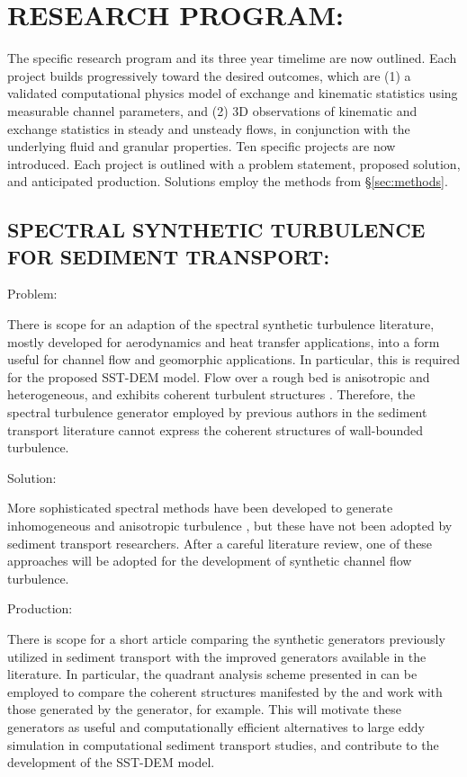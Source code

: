 \section{RESEARCH PROGRAM:} \label{sec:program}

The specific research program and its three year timelime are now outlined. Each project builds progressively toward the desired outcomes, which are (1) a validated computational physics model of exchange and kinematic statistics using measurable channel parameters, and (2) 3D observations of kinematic and exchange statistics in steady and unsteady flows, in conjunction with the underlying fluid and granular properties. Ten specific projects are now introduced. Each project is outlined with a problem statement, proposed solution, and anticipated production. Solutions employ the methods from \S \ref{sec:methods}. 

\subsection{SPECTRAL SYNTHETIC TURBULENCE FOR SEDIMENT TRANSPORT:} 

Problem: 

There is scope for an adaption of the spectral synthetic turbulence literature, mostly developed for aerodynamics and heat transfer applications, into a form useful for channel flow and geomorphic applications. In particular, this is required for the proposed SST-DEM model.  Flow over a rough bed is anisotropic and heterogeneous, and exhibits coherent turbulent structures \citep{Adrian2007}. Therefore, the spectral turbulence generator employed by previous authors in the sediment transport literature \citep{Bialik2012,Nikora2001} cannot express the coherent structures of wall-bounded turbulence. 
\bigskip 

Solution: 

More sophisticated spectral methods have been developed to generate inhomogeneous and anisotropic turbulence \citep{Smirnov2001, Clark2011, Shur2014, Adler2018}, but these have not been adopted by sediment transport researchers. After a careful literature review, one of these approaches will be adopted for the development of synthetic channel flow turbulence. 
\bigskip 

Production:
 
There is scope for a short article comparing the synthetic generators previously utilized in sediment transport with the improved generators available in the literature. In particular, the quadrant analysis scheme presented in \cite{Ferreira2009} can be employed to compare the coherent structures manifested by the \cite{Nikora2001a} and \citep{Bialik2013} work with those generated by the \cite{Shur2014} generator, for example. This will motivate these generators as useful and computationally efficient alternatives to large eddy simulation in computational sediment transport studies, and contribute to the development of the SST-DEM model. 
\bigskip 



